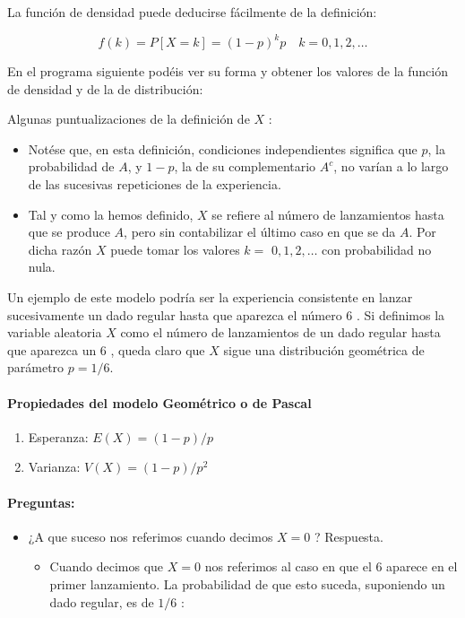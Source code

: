 \documentclass[
]{article}
\providecommand{\tightlist}{%
  \setlength{\itemsep}{0pt}\setlength{\parskip}{0pt}}
\begin{document}
La función de densidad puede deducirse fácilmente de la definición:

\[
f(k)=P[X=k]=(1-p)^{k} p \quad k=0,1,2, \ldots
\]

En el programa siguiente podéis ver su forma y obtener los valores de la función de densidad y de la de distribución:

Algunas puntualizaciones de la definición de \(X\) :

\begin{itemize}
\tightlist
\item
  Notése que, en esta definición, condiciones independientes significa que \(p\), la probabilidad de \(A\), y \(1-p\), la de su complementario \(A^{c}\), no varían a lo largo de las sucesivas repeticiones de la experiencia.
\item
  Tal y como la hemos definido, \(X\) se refiere al número de lanzamientos hasta que se produce \(A\), pero sin contabilizar el último caso en que se da \(A\). Por dicha razón \(X\) puede tomar los valores \(k=\) \(0,1,2, \ldots\) con probabilidad no nula.
\end{itemize}

Un ejemplo de este modelo podría ser la experiencia consistente en lanzar sucesivamente un dado regular hasta que aparezca el número 6 . Si definimos la variable aleatoria \(X\) como el número de lanzamientos de un dado regular hasta que aparezca un 6 , queda claro que \(X\) sigue una distribución geométrica de parámetro \(p=1 / 6\).

\paragraph{Propiedades del modelo Geométrico o de Pascal}\label{propiedades-del-modelo-geomuxe9trico-o-de-pascal}

\begin{enumerate}
\def\labelenumi{\arabic{enumi})}
\tightlist
\item
  Esperanza: \(E(X)=(1-p) / p\)
\item
  Varianza: \(V(X)=(1-p) / p^{2}\)
\end{enumerate}

\paragraph{Preguntas:}\label{preguntas}

\begin{itemize}
\item
  ¿A que suceso nos referimos cuando decimos \(X=0\) ? Respuesta.

  \begin{itemize}
  \tightlist
  \item
    Cuando decimos que \(X=0\) nos referimos al caso en que el 6 aparece en el primer lanzamiento. La probabilidad de que esto suceda, suponiendo un dado regular, es de \(1 / 6\) :
  \end{itemize}
\end{itemize}
\end{document}
